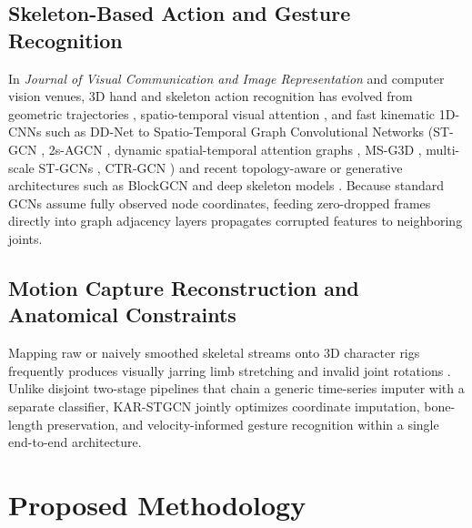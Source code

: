 \documentclass[10pt,twocolumn]{article}
\begin{document}
\subsection{Skeleton-Based Action and Gesture Recognition}
In \textit{Journal of Visual Communication and Image Representation} and computer vision venues, 3D hand and skeleton action recognition has evolved from geometric trajectories \cite{marin2016hand,boulahia2017dynamic,kumar2018position}, spatio-temporal visual attention \cite{yang2019action}, and fast kinematic 1D-CNNs such as DD-Net \cite{yang2019make} to Spatio-Temporal Graph Convolutional Networks (ST-GCN \cite{yan2018spatial}, 2s-AGCN \cite{shi2019two}, dynamic spatial-temporal attention graphs \cite{chen2020construct}, MS-G3D \cite{liu2020disentangling}, multi-scale ST-GCNs \cite{li2021spatio}, CTR-GCN \cite{chen2021channel}) and recent topology-aware or generative architectures such as BlockGCN \cite{zhou2024blockgcn} and deep skeleton models \cite{asteasuain2022applying,rastgoo2025deep}. Because standard GCNs assume fully observed node coordinates, feeding zero-dropped frames directly into graph adjacency layers propagates corrupted features to neighboring joints.

\subsection{Motion Capture Reconstruction and Anatomical Constraints}
Mapping raw or naively smoothed skeletal streams onto 3D character rigs frequently produces visually jarring limb stretching and invalid joint rotations \cite{tirakoat2011optimized,noiumkar2013use,chen2018nonparametric}. Unlike disjoint two-stage pipelines that chain a generic time-series imputer with a separate classifier, KAR-STGCN jointly optimizes coordinate imputation, bone-length preservation, and velocity-informed gesture recognition within a single end-to-end architecture.

\section{Proposed Methodology}
\end{document}
